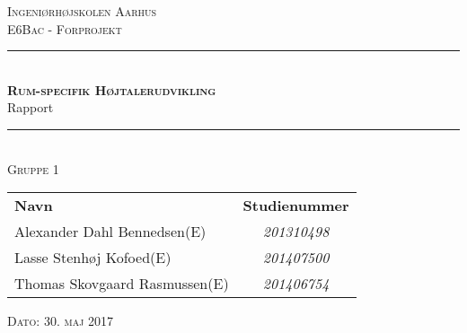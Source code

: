 \newcommand{\HRule}{\rule{\linewidth}{0.1mm}} %

\thispagestyle{empty}
\begin{center}
	\textsc{\LARGE Ingeniørhøjskolen Aarhus}\\[1.5cm] %

	
	\textsc{\large E6Bac - Forprojekt}\\[2.5cm] 
	\HRule \\[0.8cm]
	{\huge \bfseries \textsc{Rum-specifik Højtalerudvikling}} \\[0.5cm]{\LARGE Rapport} \\[0.4cm]
	\HRule \\[1.5cm]
	
	\textsc{\large Gruppe 1}\\
	\vspace{0.5 in}
	\begin{center}
		\begin{tabular}{l c}
			\textbf{Navn} & \textbf{Studienummer} \\
			Alexander Dahl Bennedsen(E) & \textsl{201310498}    \\
			Lasse Stenhøj Kofoed(E) & \textsl{201407500}  \\
			Thomas Skovgaard Rasmussen(E) & \textsl{201406754}
			
			
		\end{tabular}
	\end{center}
	\vspace{0.5 in}
	
	\vspace{0.5 in}
	
	\textsc{\large Dato: 30. maj 2017}\\
	
\end{center} %

\newpage